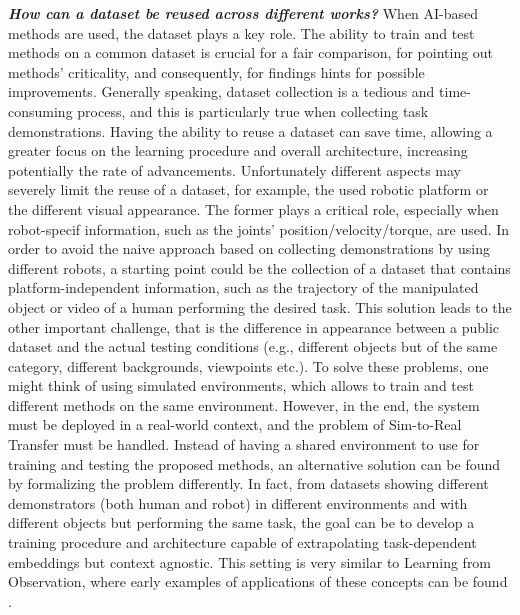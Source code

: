\newline \textbf{\textit{How can a dataset be reused across different works?}} When AI-based methods are used, the dataset plays a key role. The ability to train and test methods on a common dataset is crucial for a fair comparison, for pointing out methods' criticality, and consequently, for findings hints for possible improvements. Generally speaking, dataset collection is a tedious and time-consuming process, and this is particularly true when collecting task demonstrations. Having the ability to reuse a dataset can save time, allowing a greater focus on the learning procedure and overall architecture, increasing potentially the rate of advancements. Unfortunately different aspects may severely limit the reuse of a dataset, for example, the used robotic platform or the different visual appearance. The former plays a critical role, especially when robot-specif information, such as the joints' position/velocity/torque, are used.%
In order to avoid the naive approach based on collecting demonstrations by using different robots, a starting point could be the collection of a dataset that contains platform-independent information, such as the trajectory of the manipulated object or video of a human performing the desired task. This solution leads to the other important challenge, that is the difference in appearance between a public dataset and the actual testing conditions (e.g., different objects but of the same category, different backgrounds, viewpoints etc.). To solve these problems, one might think of using simulated environments, which allows to train and test different methods on the same environment. However, in the end, the system must be deployed in a real-world context, and the problem of Sim-to-Real Transfer must be handled. Instead of having a shared environment to use for training and testing the proposed methods, an alternative solution can be found by formalizing the problem differently. In fact, from datasets showing different demonstrators (both human and robot) in different environments and with different objects but performing the same task, the goal can be to develop a training procedure and architecture capable of extrapolating task-dependent embeddings but context agnostic. This setting is very similar to Learning from Observation, where early examples of applications of these concepts can be found \cite{sermanet2018time_contrastive,zakka2022xirl}.
